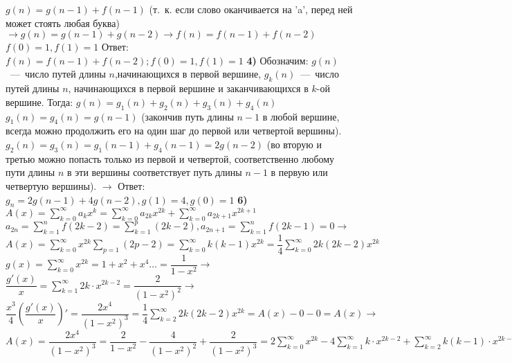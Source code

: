 \documentclass[12pt,a4paper,fleqn]{article}
\begin{document}
$g(n) = g(n -1) + f(n -1)$ (т.~к. если слово оканчивается на 'a', перед ней может стоять любая буква) \newline
$\rightarrow g(n) = g(n - 1) + g(n - 2) \rightarrow f(n) = f(n -1) + f(n - 2)$ \newline
$f(0) = 1, f(1) = 1$
Ответ: $f(n) = f(n - 1) + f(n - 2); f(0) = 1, f(1) = 1$ \newline \newline 
{\bf 4)} Обозначим: $g(n)$~---~число путей длины $n$,начинающихся в первой вершине, $g_k(n)$~---~число путей длины $n$, начинающихся в первой вершине и заканчивающихся в $k$-ой вершине. Тогда: \newline
$g(n) = g_1(n) + g_2(n) + g_3(n) + g_4(n)$ \newline
$g_1(n) = g_4(n) = g (n - 1)$ (закончив путь длины $n -1$ в любой вершине, всегда можно продолжить его на один шаг до первой или четвертой вершины). \newline
$g_2(n) = g_3(n) = g_1(n-1) + g_4(n-1) = 2g(n-2)$ (во вторую и третью можно попасть только из первой и четвертой, соответственно любому пути длины $n$ в эти вершины соответствует путь длины $n -1$ в первую или четвертую вершины). \newline
$\rightarrow$ Ответ: $g_n = 2g(n-1) + 4g(n-2), g(1) = 4, g(0) = 1$ \newline \newline
{\bf 6)} $A(x) = \sum_{k=0}^\infty a_kx^k = \sum_{k=0}^\infty a_{2k}x^{2k} + \sum_{k=0}^\infty a_{2k + 1}x^{2k + 1}$ \newline
$a_{2n} = \sum_{k = 1}^n f(2k-2) = \sum_{k = 1}^p (2k - 2), a_{2n+1} = \sum_{k=1}^n f(2k-1) = 0 \rightarrow$ \newline
$A(x) = \sum_{k=0}^\infty x^{2k} \sum_{p=1} (2p - 2) = \sum_{k=0}^\infty k(k-1)x^{2k} = \dfrac{1}{4} \sum_{k=0}^\infty 2k (2k -2) x^{2k}$ \newline
$g(x) = \sum_{k=0}^\infty x^{2k} = 1 + x^2 + x^4 \ldots = \dfrac{1}{1 - x^2} \rightarrow$ \newline
$\dfrac{g'(x)}{x} = \sum_{k=1}^\infty 2k \cdot x^{2k - 2} = \dfrac{2}{(1 -x^2)^2} \rightarrow$ \newline
$\dfrac{x^3}{4} \left( \dfrac{g'(x)}{x} \right)' = \dfrac{2x^4}{(1-x^2)^3} =  \dfrac{1}{4} \sum_{k=2}^\infty 2k(2k - 2)x^{2k} = A(x) - 0 - 0 = A(x) \rightarrow$ \newline
$A(x) = \dfrac{2x^4}{(1 - x^2)^3} = \dfrac{2}{1 - x^2} - \dfrac{4}{(1 -x^2)^2} + \dfrac{2}{(1-x^2)^3} = 2\sum_{k=0}^\infty x^{2k} - 4\sum_{k=1}^\infty k \cdot x^{2k -2} + \sum_{k=2}^\infty k(k-1) \cdot x^{2k - 4} = 2\sum_{k=0}^\infty (k^2 - k) \cdot x^{2k} \rightarrow$ \newline
\end{document}

